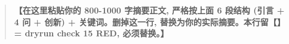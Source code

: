 \begin{abstract}









\textbf{【在这里粘贴你的 800-1000 字摘要正文, 严格按上面 6 段结构 (引言 + 4 问 + 创新) + 关键词。删掉这一行, 替换为你的实际摘要。本行留【】= dryrun check 15 RED, 必须替换。】}

\label{abstract:end}

\end{abstract}
